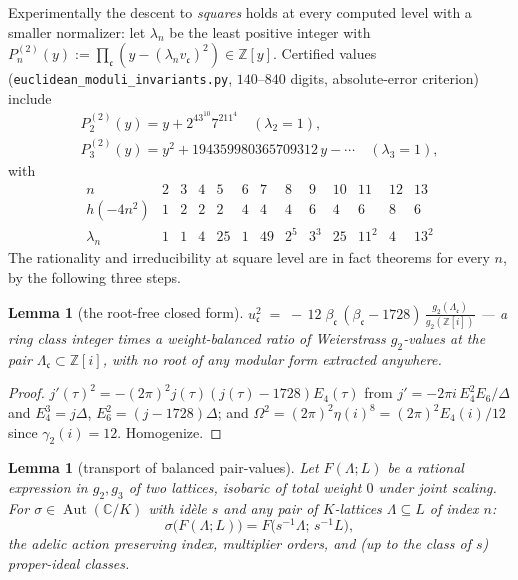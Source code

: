 \documentclass[11pt]{amsart}
\numberwithin{equation}{section}
\theoremstyle{plain}
\newtheorem{lemma}[theorem]{Lemma}
\theoremstyle{definition}
\theoremstyle{remark}
\newcommand{\C}{\mathbb{C}}
\newcommand{\Z}{\mathbb{Z}}
\newcommand{\Zi}{\Z[i]}
\newcommand{\idealc}{\mathfrak{c}}
\begin{document}
Experimentally the descent to \emph{squares} holds at every computed
level with a smaller normalizer: let $\lambda_n$ be the least positive
integer with $P^{(2)}_n(y) := \prod_{\idealc}(y -
(\lambda_nv_{\idealc})^2) \in \Z[y]$.  Certified values
(\texttt{euclidean\_moduli\_invariants.py}, $140$--$840$ digits,
absolute-error criterion) include
\begin{gather*}
  P^{(2)}_2(y) = y + 2^43^{10}7^211^4 \quad (\lambda_2 = 1),\\
  P^{(2)}_3(y) = y^2 + 194359980365709312\,y - \cdots \quad
  (\lambda_3 = 1),
\end{gather*}
with
\[
\begin{array}{c|cccccccccccc}
n & 2 & 3 & 4 & 5 & 6 & 7 & 8 & 9 & 10 & 11 & 12 & 13\\
\hline
h(-4n^2) & 1 & 2 & 2 & 2 & 4 & 4 & 4 & 6 & 4 & 6 & 8 & 6\\
\lambda_n & 1 & 1 & 4 & 25 & 1 & 49 & 2^5 & 3^3 & 25 & 11^2 & 4 &
13^2
\end{array}
\]
The rationality and irreducibility at square level are in fact
theorems for every $n$, by the following three steps.

\begin{lemma}[the root-free closed form]\label{lem:g2form}
$\displaystyle
u_{\idealc}^2 \;=\; -\,12\;\beta_{\idealc}\,(\beta_{\idealc} - 1728)\,
\frac{g_2(\Lambda_{\idealc})}{g_2(\Zi)}$ --- a ring class integer
times a weight-balanced ratio of Weierstrass $g_2$-values at the pair
$\Lambda_{\idealc} \subset \Zi$, with no root of any modular form
extracted anywhere.
\end{lemma}

\begin{proof}
$j'(\tau)^2 = -(2\pi)^2 j(\tau)(j(\tau) - 1728)E_4(\tau)$ from $j' =
-2\pi i\,E_4^2E_6/\Delta$ and $E_4^3 = j\Delta$, $E_6^2 = (j -
1728)\Delta$; and $\Omega^2 = (2\pi)^2\eta(i)^8 = (2\pi)^2E_4(i)/12$
since $\gamma_2(i) = 12$.  Homogenize.
\end{proof}

\begin{lemma}[transport of balanced pair-values]\label{lem:lemmaT}
Let $F(\Lambda; L)$ be a rational expression in $g_2, g_3$ of two
lattices, isobaric of total weight $0$ under joint scaling.  For
$\sigma \in \operatorname{Aut}(\C/K)$ with id\`ele $s$ and any pair of
$K$-lattices $\Lambda \subseteq L$ of index $n$:
\[
  \sigma\bigl(F(\Lambda; L)\bigr) = F\bigl(s^{-1}\Lambda;\,
  s^{-1}L\bigr),
\]
the adelic action preserving index, multiplier orders, and (up to the
class of $s$) proper-ideal classes.
\end{lemma}
\end{document}
